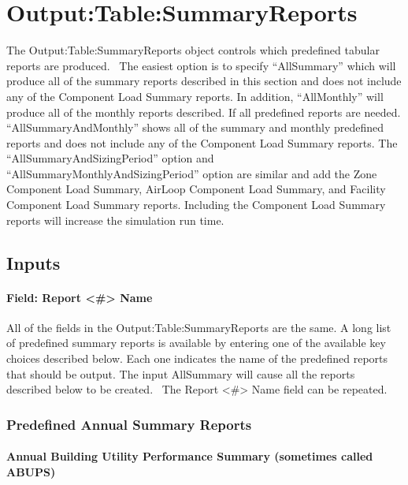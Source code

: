 \section{Output:Table:SummaryReports}\label{outputtablesummaryreports}

The Output:Table:SummaryReports object controls which predefined tabular reports are produced.~ The easiest option is to specify ``AllSummary'' which will produce all of the summary reports described in this section and does not include any of the Component Load Summary reports. In addition, ``AllMonthly'' will produce all of the monthly reports described. If all predefined reports are needed. ``AllSummaryAndMonthly'' shows all of the summary and monthly predefined reports and does not include any of the Component Load Summary reports. The ``AllSummaryAndSizingPeriod'' option and ``AllSummaryMonthlyAndSizingPeriod'' option are similar and add the Zone Component Load Summary, AirLoop Component Load Summary, and Facility Component Load Summary reports. Including the Component Load Summary reports will increase the simulation run time.

\subsection{Inputs}\label{inputs-064}

\paragraph{Field: Report \textless{}\#\textgreater{} Name}\label{field-report-name}

All of the fields in the Output:Table:SummaryReports are the same. A long list of predefined summary reports is available by entering one of the available key choices described below. Each one indicates the name of the predefined reports that should be output. The input AllSummary will cause all the reports described below to be created.~ The Report \textless{}\#\textgreater{} Name field can be repeated.

\subsubsection{Predefined Annual Summary Reports}\label{predefined-annual-summary-reports}

\paragraph{Annual Building Utility Performance Summary (sometimes called ABUPS)}\label{annual-building-utility-performance-summary-sometimes-called-abups}

